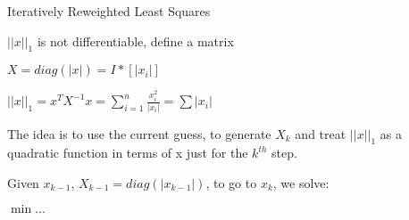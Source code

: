 \documentclass[12pt,letterpaper]{report}
\begin{document}
Iteratively Reweighted Least Squares

$||x||_1$ is not differentiable, define a matrix

$X = diag(|x|) = I * [|x_i|]$

$||x||_1 = x^T X^{-1}  x = \sum\limits_{i = 1}^n \frac{x_i^2}{|x_i|} =  \sum |x_i|$

The idea is to use the current guess, to generate $X_k$ and treat $||x||_1$ as a quadratic function in terms of x just for the $k^{th}$ step.

Given $x_{k-1}$, $X_{k-1} = diag(|x_{k-1}|)$, to go to $x_k$, we solve:

$\min ...$
\end{document}
